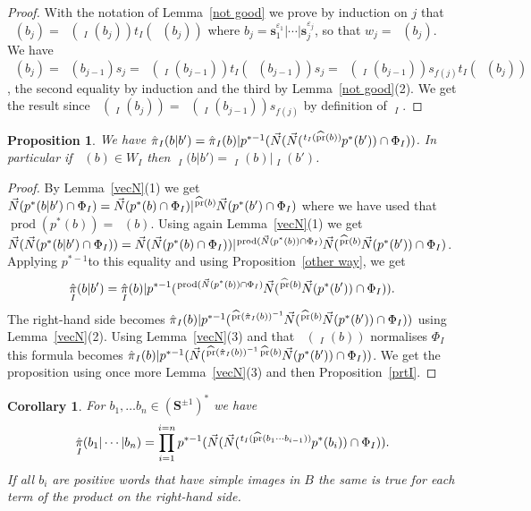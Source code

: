 \documentclass{amsart}
\numberwithin{equation}{section}
\newtheorem{proposition}[equation]{Proposition}
\newtheorem{corollary}[equation]{Corollary}
\newcommand\ve{\varepsilon}
\newcommand\vN{\vec N}
\newcommand\lexp[2]{\kern\scriptspace\vphantom{#2}^{#1}\kern-\scriptspace#2}
\newcommand\inv{^{-1}}
\newcommand\bs{{\mathbf s}}
\newcommand\bS{{\mathbf S}}
\DeclareMathOperator\hpr{\widehat{pr}}
\DeclareMathOperator\hpi{\hat\pi}
\DeclareMathOperator\product{prod}
\begin{document}
\begin{proof}
With the notation of Lemma~\ref{not good} we prove by induction on $j$ that  
$\hpr(b_j)=\hpr(\hpi_I(b_j))t_I(\hpr(b_j))$ where
$b_j=\bs_1^{\ve_1}|\cdots|\bs_j^{\ve_j}$, so that $w_j=\hpr(b_j)$. We have
$\hpr(b_j)=\hpr(b_{j-1})s_j=\hpr(\hpi_I(b_{j-1}))t_I(\hpr(b_{j-1}))s_j=
\hpr(\hpi_I(b_{j-1}))s_{f(j)}t_I(\hpr(b_j))$,
the second equality by induction and the third by Lemma~\ref{not good}(2).
We get the result since $\hpr(\hpi_I(b_j))=\hpr(\hpi_I(b_{j-1}))s_{f(j)}$ by
definition of $\hpi_I$.
\end{proof}
\begin{proposition}\label{pi(bb')} We have $\hpi_I(b|b')=\hpi_I(b)|
p^{*-1}(\vN(\vN(\lexp{t_I(\hpr(b))}p^*(b'))\cap \Phi_I))$.
In particular if $\hpr(b)\in W_I$ then $\hpi_I(b|b')=\hpi_I(b)|\hpi_I(b')$.
\end{proposition}
\begin{proof}
 By Lemma~\ref{vecN}(1) we get 
 $\vN(p^*(b|b')\cap \Phi_I)=\vN(p^*(b)\cap \Phi_I)
|\lexp{\hpr(b)}\vN(p^*(b')\cap \Phi_I)$ where we have used that
 $\product(p^*(b))=\hpr(b)$. Using again Lemma~\ref{vecN}(1) we
get $\vN(\vN(p^*(b|b')\cap \Phi_I))=\vN(\vN(p^*(b)\cap \Phi_I)) 
|\lexp{\product(\vN(p^*(b))\cap \Phi_I)}\vN(\lexp{\hpr(b)}\vN(p^*(b'))\cap
\Phi_I)$. Applying $p^{*-1}$to this equality and 
using Proposition~\ref{other way}, we get
$$\hpi_I(b|b')=\hpi_I(b)|p^{*-1}(\lexp{\product(\vN(p^*(b))\cap
 \Phi_I)}\vN(\lexp{\hpr(b)}\vN(p^*(b'))\cap \Phi_I)).$$ 
The right-hand side becomes 
$\hpi_I(b)|p^{*-1}(\lexp{\hpr(\hpi_I(b))\inv}
\vN(\lexp{\hpr(b)}\vN(p^*(b'))\cap \Phi_I))$ using  Lemma~\ref{vecN}(2).
Using Lemma~\ref{vecN}(3)
and that $\hpr(\hpi_I(b))$ normalises $\Phi_I$ this formula becomes
$\hpi_I(b)|p^{*-1}(\vN(\lexp{\hpr(\hpi_I(b))\inv\hpr(b)}\vN(p^*(b'))\cap
 \Phi_I))$.
We get the proposition using once more Lemma~\ref{vecN}(3) and then
Proposition~\ref{prtI}.
\end{proof}
\begin{corollary}\label{pi(b1..bn)} For  $b_1,\ldots b_n\in(\bS^{\pm 1})^*$ 
we have $$\hpi_I(b_1|\cdots|b_n)=\prod_{i=1}^{i=n} p^{*-1}(\vN(\vN(\lexp{t_I(\hpr(b_1\cdots b_{i-1}))}p^*(b_i))\cap\Phi_I)).$$
If all $b_i$ are positive words that have simple images in $B$ the same is true for each term 
of the product on the right-hand side.
\end{corollary}
\end{document}
